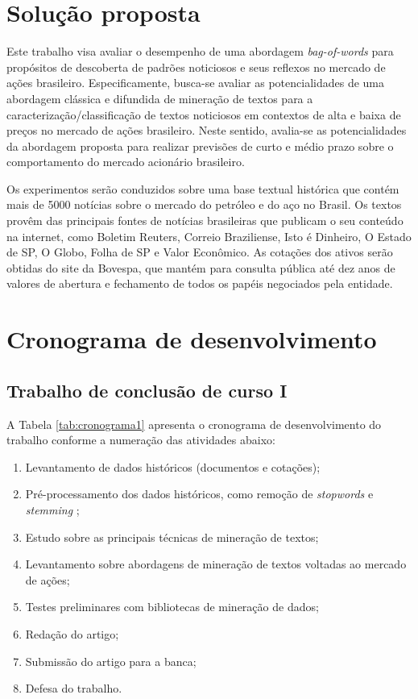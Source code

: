\documentclass[11pt,a4paper]{article}
\begin{document}
\section{Solução proposta}

Este trabalho visa avaliar o desempenho de uma abordagem \textit{bag-of-words} \cite{Manning:IR}
para propósitos de descoberta de padrões noticiosos e seus reflexos no mercado de ações brasileiro.
Especificamente, busca-se avaliar as potencialidades de uma abordagem clássica e difundida de mineração
de textos para a caracterização/classificação de textos noticiosos em contextos de alta e baixa de
preços no mercado de ações brasileiro. Neste sentido, avalia-se as potencialidades da abordagem proposta
para realizar previsões de curto e médio prazo sobre o comportamento do mercado acionário brasileiro.

Os experimentos serão conduzidos sobre uma base textual histórica que contém mais de 5000 notícias
sobre o mercado do petróleo e do aço no Brasil. Os textos provêm das principais fontes de notícias
brasileiras que publicam o seu conteúdo na internet, como Boletim Reuters, Correio Braziliense, Isto é Dinheiro,
O Estado de SP, O Globo, Folha de SP e Valor Econômico. As cotações dos ativos serão obtidas do site da Bovespa,
que mantém para consulta pública até dez anos de valores de abertura e fechamento de todos os papéis negociados pela entidade.


\section{Cronograma de desenvolvimento}\label{sec:cronograma}

\subsection{Trabalho de conclusão de curso I}

A Tabela \ref{tab:cronograma1} apresenta o cronograma de desenvolvimento do trabalho conforme a numeração das atividades abaixo:
\begin{enumerate}
  \item Levantamento de dados históricos (documentos e cotações);
  \item Pré-processamento dos dados históricos, como remoção de \textit{stopwords} e \textit{stemming} \cite{Weiss:textMining,orengo_stemming};
  \item Estudo sobre as principais técnicas de mineração de textos;
  \item Levantamento sobre abordagens de mineração de textos voltadas ao mercado de ações;
  \item Testes preliminares com bibliotecas de mineração de dados;
  \item Redação do artigo;
  \item Submissão do artigo para a banca;
  \item Defesa do trabalho.
\end{enumerate}
\end{document}
